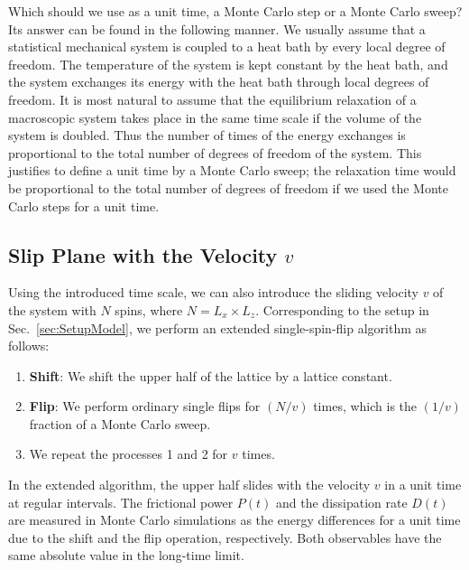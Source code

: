 Which should we use as a unit time, a Monte Carlo step or a Monte Carlo sweep? Its answer can be found in the following manner. We usually assume that a statistical mechanical system is coupled to a heat bath by every local degree of freedom. The temperature of the system is kept constant by the heat bath, and the system exchanges its energy with the heat bath through local degrees of freedom. It is most natural to assume that the equilibrium relaxation of a macroscopic system takes place in the same time scale if the volume of the system is doubled. Thus the number of times of the energy exchanges is proportional to the total number of degrees of freedom of the system. This justifies to define a unit time by a Monte Carlo sweep; the relaxation time would be proportional to the total number of degrees of freedom if we used the Monte Carlo steps for a unit time.

\subsection{Slip Plane with the Velocity $v$}\label{subsec:SlipPlaneWithV}
Using the introduced time scale, we can also introduce the sliding velocity $v$ of the system with $N$ spins, where $N=L_{x}\times L_{z}$. Corresponding to the setup in Sec.~\ref{sec:SetupModel}, we perform an extended single-spin-flip algorithm as follows:
\begin{enumerate}
	\item \textbf{Shift}: We shift the upper half of the lattice by a lattice constant.
	\item \textbf{Flip}: We perform ordinary single flips for $(N/v)$ times, which is the $(1/v)$ fraction of a Monte Carlo sweep.
	\item We repeat the processes 1 and 2 for $v$ times.
\end{enumerate}
In the extended algorithm, the upper half slides with the velocity $v$ in a unit time at regular intervals. The frictional power $P(t)$ and the dissipation rate $D(t)$ are measured in Monte Carlo simulations as the energy differences for a unit time due to the shift and the flip operation, respectively. Both observables have the same absolute value in the long-time limit.

